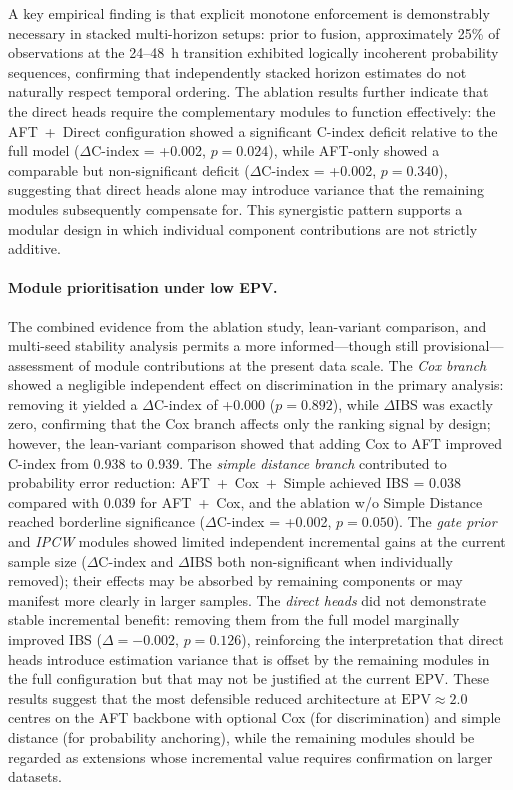 \documentclass[fire,article,submit,pdftex]{../Definitions/mdpi}
\begin{document}
A key empirical finding is that explicit monotone enforcement is demonstrably necessary in stacked multi-horizon setups: prior to fusion, approximately 25\% of observations at the 24--48~h transition exhibited logically incoherent probability sequences, confirming that independently stacked horizon estimates do not naturally respect temporal ordering.
The ablation results further indicate that the direct heads require the complementary modules to function effectively: the AFT~+~Direct configuration showed a significant C-index deficit relative to the full model ($\Delta$C-index = +0.002, $p = 0.024$), while AFT-only showed a comparable but non-significant deficit ($\Delta$C-index = +0.002, $p = 0.340$), suggesting that direct heads alone may introduce variance that the remaining modules subsequently compensate for.
This synergistic pattern supports a modular design in which individual component contributions are not strictly additive.

\paragraph{Module prioritisation under low EPV.}
The combined evidence from the ablation study, lean-variant comparison, and multi-seed stability analysis permits a more informed---though still provisional---assessment of module contributions at the present data scale.
The \emph{Cox branch} showed a negligible independent effect on discrimination in the primary analysis: removing it yielded a $\Delta$C-index of +0.000 ($p = 0.892$), while $\Delta$IBS was exactly zero, confirming that the Cox branch affects only the ranking signal by design; however, the lean-variant comparison showed that adding Cox to AFT improved C-index from 0.938 to 0.939.
The \emph{simple distance branch} contributed to probability error reduction: AFT~+~Cox~+~Simple achieved IBS = 0.038 compared with 0.039 for AFT~+~Cox, and the ablation w/o Simple Distance reached borderline significance ($\Delta$C-index = +0.002, $p = 0.050$).
The \emph{gate prior} and \emph{IPCW} modules showed limited independent incremental gains at the current sample size ($\Delta$C-index and $\Delta$IBS both non-significant when individually removed); their effects may be absorbed by remaining components or may manifest more clearly in larger samples.
The \emph{direct heads} did not demonstrate stable incremental benefit: removing them from the full model marginally improved IBS ($\Delta = -0.002$, $p = 0.126$), reinforcing the interpretation that direct heads introduce estimation variance that is offset by the remaining modules in the full configuration but that may not be justified at the current EPV.
These results suggest that the most defensible reduced architecture at $\text{EPV} \approx 2.0$ centres on the AFT backbone with optional Cox (for discrimination) and simple distance (for probability anchoring), while the remaining modules should be regarded as extensions whose incremental value requires confirmation on larger datasets.
\end{document}
